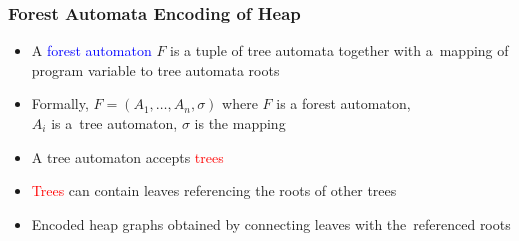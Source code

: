 \documentclass{beamer}
\newenvironment{figure*}%
{\begin{figure}}
{\end{figure}}
\newcommand{\hlbl}[1]{\textcolor{blue}{#1}}
\newcommand{\hlgr}[1]{\textcolor{olive!50!green}{#1}}
\newcommand{\hlrd}[1]{\textcolor{red}{#1}}
\newcommand{\hlye}[1]{\textcolor{magenta}{#1}}
\begin{document}
\begin{frame}
\frametitle{Forest Automata Encoding of Heap}

	\begin{itemize}
			\item A \hlbl{forest automaton} $F$ is a tuple of \hlgr{tree automata} together with a~mapping of program variable
				to tree automata roots
		    \item Formally, $F = (A_1,\ldots,A_n, \sigma)$ where $F$ is a forest automaton,\\
				$A_i$ is a~tree automaton,
				$\sigma$ is the mapping
			\item A \hlgr{tree automaton} accepts \hlrd{trees}
			\item \hlrd{Trees} can contain leaves referencing the roots of other trees
			\item Encoded heap graphs obtained by connecting leaves with the~referenced roots
	\end{itemize}

	\begin{center}
	\begin{figure}
		\begin{subfigure}{0.5\textwidth}
			\centering
			
		\end{subfigure}%
		\hspace{-0.3cm}
		\begin{subfigure}{0.5\textwidth}
			\centering
			
		\end{subfigure}
	\end{figure}
	\end{center}

\end{frame}

\end{document}
